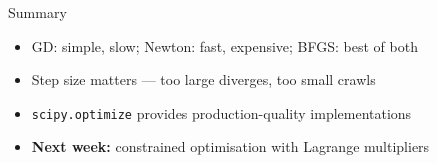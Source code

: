 \documentclass[aspectratio=169, 10pt]{beamer}
\begin{document}
\begin{frame}{Summary}
\begin{itemize}\item GD: simple, slow; Newton: fast, expensive; BFGS: best of both\item Step size matters --- too large diverges, too small crawls\item \texttt{scipy.optimize} provides production-quality implementations\item \textbf{Next week:} constrained optimisation with Lagrange multipliers\end{itemize}
\end{frame}
\end{document}
